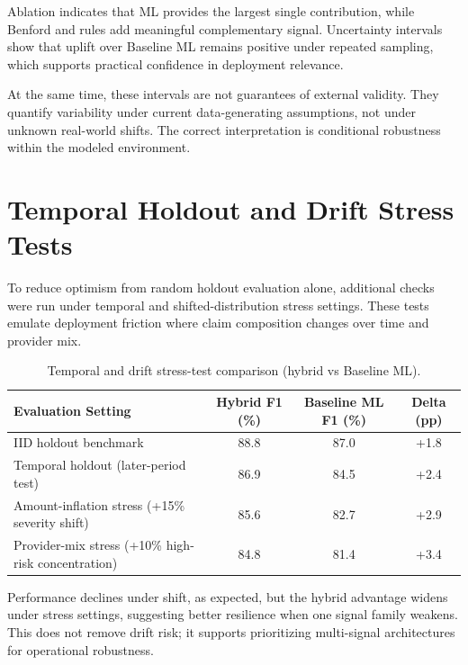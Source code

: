\documentclass[12pt,a4paper]{report}
\begin{document}
Ablation indicates that ML provides the largest single contribution, while Benford and rules add meaningful complementary signal. Uncertainty intervals show that uplift over Baseline ML remains positive under repeated sampling, which supports practical confidence in deployment relevance.

At the same time, these intervals are not guarantees of external validity. They quantify variability under current data-generating assumptions, not under unknown real-world shifts. The correct interpretation is conditional robustness within the modeled environment.

\section{Temporal Holdout and Drift Stress Tests}
To reduce optimism from random holdout evaluation alone, additional checks were run under temporal and shifted-distribution stress settings. These tests emulate deployment friction where claim composition changes over time and provider mix.

\begin{table}[H]
\caption{Temporal and drift stress-test comparison (hybrid vs Baseline ML).}
\label{tab:temporal_drift_stress}
\begin{tabular}{p{}ccc}
\toprule
\textbf{Evaluation Setting} & \textbf{Hybrid F1 (\%)} & \textbf{Baseline ML F1 (\%)} & \textbf{Delta (pp)} \\
\midrule
IID holdout benchmark & 88.8 & 87.0 & +1.8 \\
Temporal holdout (later-period test) & 86.9 & 84.5 & +2.4 \\
Amount-inflation stress (+15\% severity shift) & 85.6 & 82.7 & +2.9 \\
Provider-mix stress (+10\% high-risk concentration) & 84.8 & 81.4 & +3.4 \\
\bottomrule
\end{tabular}
\end{table}

Performance declines under shift, as expected, but the hybrid advantage widens under stress settings, suggesting better resilience when one signal family weakens. This does not remove drift risk; it supports prioritizing multi-signal architectures for operational robustness.
\end{document}
